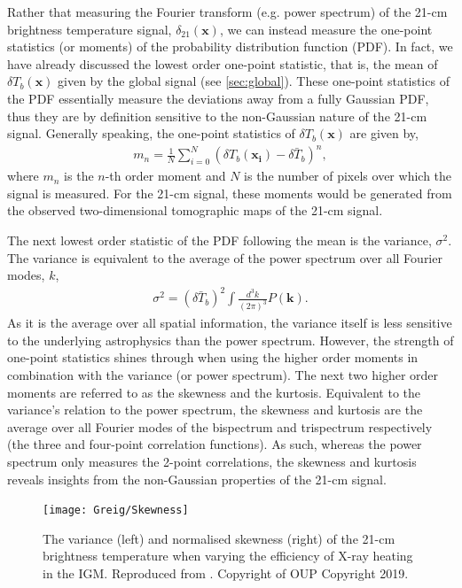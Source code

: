 Rather that measuring the Fourier transform (e.g. power spectrum) of the 21-cm brightness temperature signal, $\delta_{21}(\mathbf{x})$, we can instead measure the one-point statistics (or moments) of the probability distribution function (PDF). In fact, we have already discussed the lowest order one-point statistic, that is, the mean of $\delta T_{b}(\mathbf{x})$ given by the global signal (see \ref{sec:global}).  These one-point statistics of the PDF essentially measure the deviations away from a fully Gaussian PDF, thus they are by definition sensitive to the non-Gaussian nature of the 21-cm signal. Generally speaking, the one-point statistics of $\delta T_{b}(\mathbf{x})$ are given by,
\begin{eqnarray}
m_{n} = \frac{1}{N}\sum^{N}_{i=0}(\delta T_{b}(\mathbf{x_{i}}) - \bar{\delta T_{b}})^{n},
\end{eqnarray}
where $m_{n}$ is the $n$-th order moment and $N$ is the number of pixels over which the signal is measured. For the 21-cm signal, these moments would be generated from the observed two-dimensional tomographic maps of the 21-cm signal.

The next lowest order statistic of the PDF following the mean is the variance, $\sigma^{2}$. The variance is equivalent to the average of the power spectrum over all Fourier modes, $k$,
\begin{eqnarray}
\sigma^{2} = (\bar{\delta T_{b}})^{2} \int \frac{d^{3}k}{(2\pi)^{3}} P(\mathbf{k}).
\end{eqnarray}
As it is the average over all spatial information, the variance itself is less sensitive to the underlying astrophysics than the power spectrum. However, the strength of one-point statistics shines through when using the higher order moments in combination with the variance (or power spectrum). The next two higher order moments are referred to as the skewness and the kurtosis. Equivalent to the variance's relation to the power spectrum, the skewness and kurtosis are the average over all Fourier modes of the bispectrum and trispectrum respectively (the three and four-point correlation functions). As such, whereas the power spectrum only measures the 2-point correlations, the skewness and kurtosis reveals insights from the non-Gaussian properties of the 21-cm signal.

\begin{figure}[]
\begin{center}
\texttt{[image: Greig/Skewness]}
\end{center}
\caption{The variance (left) and normalised skewness (right) of the 21-cm brightness temperature when varying the efficiency of X-ray heating in the IGM. Reproduced from \cite{Watkinson:2015}. Copyright of OUP Copyright 2019.}
\label{fig:skewness}
\end{figure}

